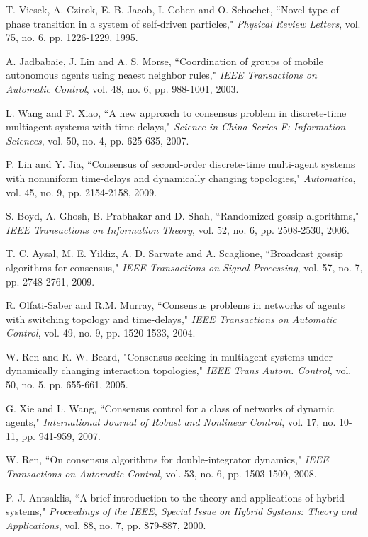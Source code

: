 \documentclass[12pt,draftcls,onecolumn]{IEEEtran}
\begin{document}
\begin{thebibliography}{1}
T. Vicsek, A. Czirok, E. B. Jacob, I. Cohen and O. Schochet,
``Novel type of phase transition in a system of self-driven particles," \emph{Physical Review Letters}, vol. 75, no. 6, pp. 1226-1229, 1995.


A. Jadbabaie, J. Lin and A. S. Morse,
``Coordination of groups of mobile autonomous agents using neaest neighbor rules,"
\emph{IEEE Transactions on Automatic Control}, vol. 48, no. 6, pp. 988-1001, 2003.

L. Wang and F. Xiao,
``A new approach to consensus problem in discrete-time multiagent systems with time-delays,"
\emph{Science in China Series F: Information Sciences}, vol. 50, no. 4, pp. 625-635, 2007.

P. Lin and Y. Jia,
``Consensus of second-order discrete-time multi-agent systems with nonuniform time-delays and dynamically changing topologies,"
\emph{Automatica}, vol. 45, no. 9, pp. 2154-2158, 2009.

S. Boyd, A. Ghosh, B. Prabhakar and D. Shah,
``Randomized gossip algorithms,"
\emph{IEEE Transactions on Information Theory},  vol. 52, no. 6, pp. 2508-2530, 2006.

T. C. Aysal, M. E. Yildiz, A. D. Sarwate and A. Scaglione,
``Broadcast gossip algorithms for consensus,"
\emph{IEEE Transactions on Signal Processing}, vol. 57, no. 7, pp. 2748-2761, 2009.

R. Olfati-Saber and R.M. Murray,
``Consensus problems in networks of agents with switching topology and time-delays,"
\emph{IEEE Transactions on Automatic Control}, vol. 49, no. 9, pp. 1520-1533, 2004.

W. Ren and R. W. Beard, "Consensus seeking in multiagent systems under dynamically changing interaction topologies,"  \emph{IEEE Trans Autom. Control}, vol. 50, no. 5, pp. 655-661, 2005.

G. Xie and L. Wang,
``Consensus control for a class of networks of dynamic agents,"
\emph{International Journal of Robust and Nonlinear Control}, vol. 17, no. 10-11, pp. 941-959, 2007.

W. Ren,
``On consensus algorithms for double-integrator dynamics,"
\emph{IEEE Transactions on Automatic Control}, vol. 53, no. 6, pp. 1503-1509, 2008.

P. J. Antsaklis,
``A brief introduction to the theory and applications of hybrid systems,"
\emph{Proceedings of the IEEE, Special Issue on Hybrid Systems: Theory and Applications}, vol. 88, no. 7, pp.  879-887, 2000.


\end{thebibliography}
\end{document}
